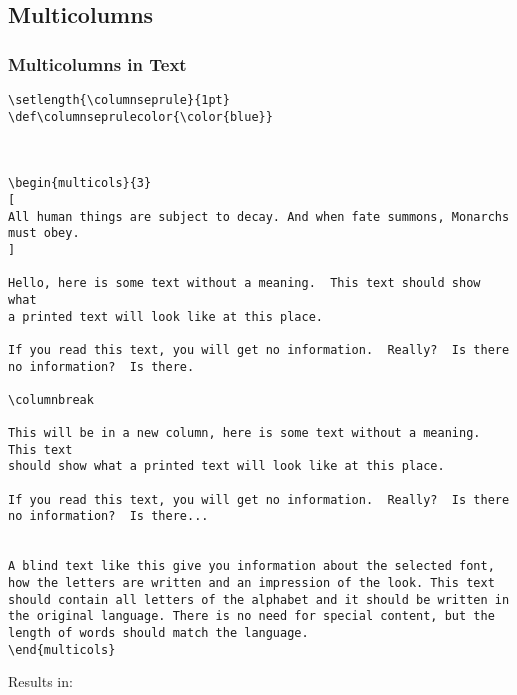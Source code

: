 


\subsection{Multicolumns}

\subsubsection{Multicolumns in Text}

\begin{lstlisting}[language=Tex]
\setlength{\columnseprule}{1pt}
\def\columnseprulecolor{\color{blue}}
 

 
\begin{multicols}{3}
[
All human things are subject to decay. And when fate summons, Monarchs must obey.
]
 
Hello, here is some text without a meaning.  This text should show what 
a printed text will look like at this place.
 
If you read this text, you will get no information.  Really?  Is there 
no information?  Is there.
 
\columnbreak
 
This will be in a new column, here is some text without a meaning.  This text 
should show what a printed text will look like at this place.
 
If you read this text, you will get no information.  Really?  Is there 
no information?  Is there...


A blind text like this give you information about the selected font, how the letters are written and an impression of the look. This text should contain all letters of the alphabet and it should be written in the original language. There is no need for special content, but the length of words should match the language.
\end{multicols}
\end{lstlisting}

Results in:

\setlength{\columnseprule}{1pt}
\def\columnseprulecolor{\color{blue}}

